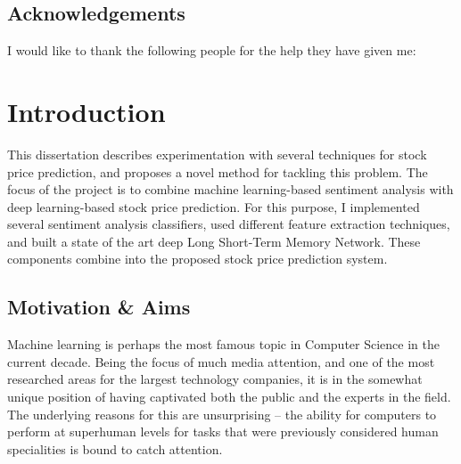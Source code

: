 \documentclass[12pt,a4paper,twoside,openright]{report}
\begin{document}
\bigskip
{}

\medskip
{}

\tableofcontents

{\listoffigures \let\cleardoublepage\clearpage \listoftables}

\newpage
\section*{Acknowledgements}

I would like to thank the following people for the help they have given me:



\pagestyle{headings}

\chapter{Introduction}


This dissertation describes experimentation with several
techniques for stock price prediction, and proposes a novel method for tackling this problem.
The focus of the project is to combine machine learning-based sentiment analysis with deep learning-based 
stock price prediction. For this purpose, I implemented several sentiment analysis classifiers,
used different feature extraction techniques, and built a state of the art deep Long Short-Term Memory Network. 
These components combine into the proposed stock price prediction system.


\section{Motivation \& Aims}

Machine learning is perhaps the most famous topic in Computer Science in the current decade.
Being the focus of much media attention, and one of the most researched areas for the largest
technology companies, it is in the somewhat unique position of having captivated both the
public and the experts in the field. The underlying reasons for this are unsurprising --
the ability for computers to perform at superhuman levels for tasks that were previously
considered human specialities is bound to catch attention.
\end{document}

